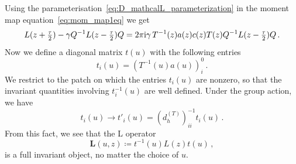 Using the parameterisation~\eqref{eq:D_mathcalL_parameterization} in the moment map equation~\eqref{eq:mom_map1eq} we get
\begin{equation}
L(z+\tfrac{\tau}{2}) - \gamma Q^{-1} L(z-\tfrac{\tau}{2}) Q =  2\pi\mathrm{i}\gamma\, T^{-1}(z) a(z) c(z) T(z) Q^{-1} L(z-\tfrac{\tau}{2}) Q \,.
\end{equation}
Now we define a diagonal matrix $t(u)$ with the following entries
\begin{equation}
\label{eq:ti_x}
t_i(u) = (T^{-1}(u) a(u))_i^0 \,.
\end{equation}
We restrict to the patch on which the entries $t_i(u)$ are nonzero, so that the invariant quantities involving $t_i^{-1}(u)$ are well defined.
Under the group action, we have
\begin{equation}
t_i(u) \to  t'_i(u) = (d_h^{(T)})_{ii}^{-1} t_i(u) \,.
\end{equation}
From this fact, we see that the L operator
\begin{equation}
\label{eq:full_inv_L}
\mathbf{L}(u,z) \coloneq t^{-1}(u) L(z) t(u) \,,
\end{equation}
is a full invariant object, no matter the choice of $u$.

